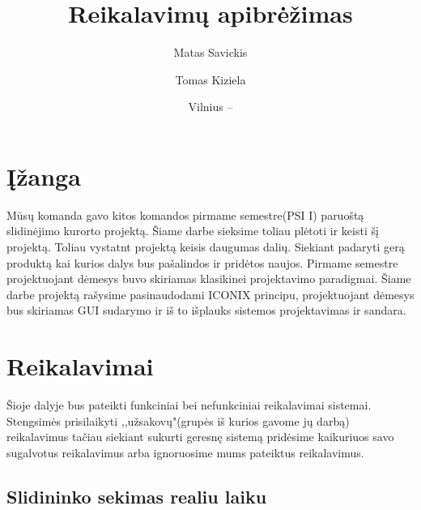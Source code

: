 \documentclass[oneside]{VUMIFPSkursinis}
\title{Reikalavimų apibrėžimas}
\author{Matas Savickis}
\author{Tomas Kiziela}
\date{Vilnius – \the\year}
\begin{document}
\maketitle
\tableofcontents

\section{Įžanga}
Mūsų komanda gavo kitos komandos pirmame semestre(PSI I) paruoštą slidinėjimo kurorto projektą. Šiame darbe sieksime toliau plėtoti ir keisti šį projektą. Toliau vystatnt projektą keisis daugumas dalių. Siekiant padaryti gerą produktą kai kurios  dalys bus pašalindos ir pridėtos naujos. Pirmame semestre projektuojant dėmesys buvo skiriamas klasikinei projektavimo paradigmai. Šiame darbe projektą rašysime pasinaudodami ICONIX principu, projektuojant dėmesys bus skiriamas GUI sudarymo ir iš to išplauks sistemos projektavimas ir sandara. 

\section{Reikalavimai}
Šioje dalyje bus pateikti funkciniai bei nefunkciniai reikalavimai sistemai. Stengsimės prisilaikyti ,,užsakovų"(grupės iš kurios gavome jų darbą) reikalavimus tačiau siekiant sukurti geresnę sistemą pridėsime kaikuriuos savo sugalvotus reikalavimus arba ignoruosime mums pateiktus reikalavimus. 
\subsection{Slidininko sekimas realiu laiku}
\end{document}
